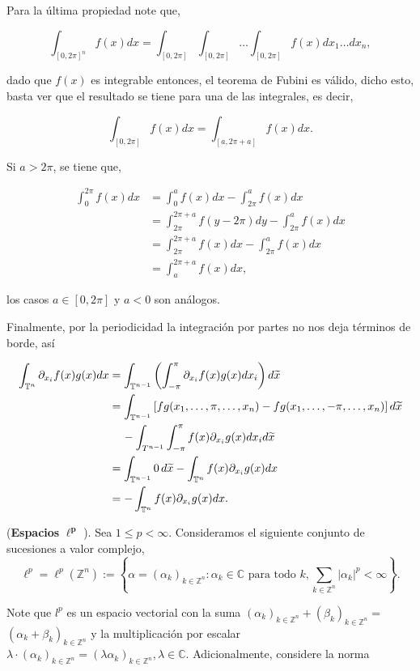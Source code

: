 \documentclass[12pt]{article}
\newcommand\Z{\ensuremath{\mathbb{Z}}}
\newcommand\T{\mathbb{T}}
\begin{document}
Para la última propiedad note que,

$$\int_{[0,2\pi]^ n}f(x)dx=\int_{[0,2\pi]}\int_{[0,2\pi]}\ldots\int_{[0,2\pi]}f(x) dx_1\ldots dx_n,$$

dado que $f(x)$ es integrable entonces, el teorema de Fubini es válido, dicho esto, basta ver que el resultado se tiene para una de las integrales, es decir,

$$\int_{[0,2\pi]}f(x)dx=\int_{[a,2\pi+a]}f(x)dx.$$

Si $a>2\pi$, se tiene que,

\begin{align*}
    \int_0^{2\pi}f(x)dx&=\int_0^af(x)dx-\int_{2\pi}^af(x) dx\\
    &=\int_{2\pi}^{2\pi+a}f(y-2\pi)dy-\int_{2\pi}^af(x)dx\\
    &=\int_{2\pi}^{2\pi+a}f(x)dx-\int_{2\pi}^af(x)dx\\
    &=\int_a^{2\pi+a}f(x)dx
,\end{align*}

los casos $a\in [0,2\pi]$ y $a<0$ son análogos.

Finalmente, por la periodicidad la integración por partes no nos deja términos de borde, así

    \begin{align*}
        \int_{\mathbb{T}^n} \partial_{x_i} f(x) g(x) d x&=\int_{\T ^{n-1}}\left(\int_{-\pi}^{\pi}\partial_{x_i} f(x) g(x)dx_{i}\right)d\widetilde{x}\\
        &=\int_{\T^{n-1}}\left[fg(x_1,\ldots,\pi,\ldots,x_n)-fg(x_1,\ldots,-\pi,\ldots,x_n)\right]d\widetilde{x}\\
        &\hspace*{0.4cm}-\int_{T^{n-1}}\int_{-\pi}^{\pi}f(x)\partial_{x_i}g(x)dx_id\widetilde{x}\\
        &=\int_{\T^{n-1}}0\,d\widetilde{x}-\int_{\T^n}f(x)\partial_{x_i}g(x)dx\\
        &=-\int_{\T^n}f(x)\partial_{x_i}g(x)dx.
    \end{align*}

(\textbf{Espacios} $\mathbf{\ell^p}$ ). Sea $1 \leq p<\infty$. Consideramos el siguiente conjunto de sucesiones  a valor complejo,
$$
\ell^p=\ell^p(\mathbb{Z}^n):=\left\{\alpha=\left(\alpha_k\right)_{k \in \mathbb{Z}^n}: \alpha_k \in \mathbb{C} \text { para todo } k, \sum_{k\in \Z^n}\left|\alpha_k\right|^p<\infty\right\}.
$$


Note que $l^p$ es un espacio vectorial con la suma $\left(\alpha_k\right)_{k \in \mathbb{Z}^n}+\left(\beta_k\right)_{k \in \mathbb{Z}^n}=$ $\left(\alpha_k+\beta_k\right)_{k \in \mathbb{Z}^n}$ y la multiplicación por escalar $\lambda \cdot\left(\alpha_k\right)_{k \in \mathbb{Z}^n}=\left(\lambda \alpha_k\right)_{k \in \mathbb{Z}^n}, \lambda \in \mathbb{C}$. Adicionalmente, considere la norma
\end{document}
